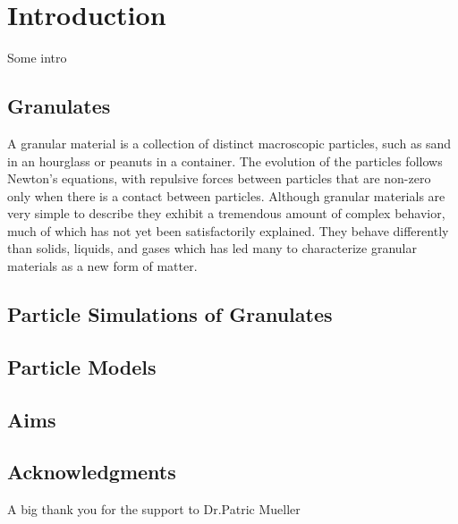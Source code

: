 %
% 


\chapter{Introduction}

Some intro

\section{Granulates}

A granular material is a collection of distinct macroscopic particles, such as sand in an hourglass or peanuts in a container.  The evolution of the particles follows Newton's equations, with repulsive forces between particles that are non-zero only when there is a contact between particles.  Although granular materials are very simple to describe they exhibit a tremendous amount of complex behavior, much of which has not yet been satisfactorily explained.  They behave differently than solids, liquids, and gases which has led many to characterize granular materials as a new form of matter. 

\section{Particle Simulations of Granulates}


\section{Particle Models}


\section{Aims}


\section{Acknowledgments}

A big thank you for the support to Dr.Patric Mueller

